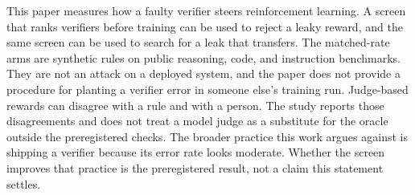 This paper measures how a faulty verifier steers reinforcement learning.
A screen that ranks verifiers before training can be used to reject a leaky reward, and the same screen can be used to search for a leak that transfers.
The matched-rate arms are synthetic rules on public reasoning, code, and instruction benchmarks.
They are not an attack on a deployed system, and the paper does not provide a procedure for planting a verifier error in someone else's training run.
Judge-based rewards can disagree with a rule and with a person.
The study reports those disagreements and does not treat a model judge as a substitute for the oracle outside the preregistered checks.
The broader practice this work argues against is shipping a verifier because its error rate looks moderate.
Whether the screen improves that practice is the preregistered result, not a claim this statement settles.
